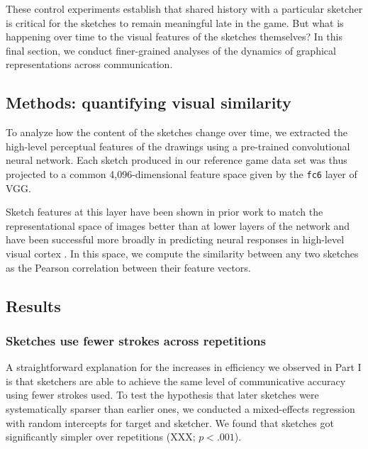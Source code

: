 \documentclass[10pt,letterpaper]{article}
\begin{document}
These control experiments establish that shared history with a particular sketcher is critical for the sketches to remain meaningful late in the game. 
But what is happening over time to the visual features of the sketches themselves? 
In this final section, we conduct finer-grained analyses of the dynamics of graphical representations across communication.



\subsection{Methods: quantifying visual similarity}

To analyze how the content of the sketches change over time, we extracted the high-level perceptual features of the drawings using a pre-trained convolutional neural network. 
Each sketch produced in our reference game data set was thus projected to a common 4,096-dimensional feature space given by the \texttt{fc6} layer of VGG. 

Sketch features at this layer have been shown in prior work to match the representational space of images better than at lower layers of the network \cite{FanCommon2018} and have been successful more broadly in predicting neural responses in high-level visual cortex \cite{yamins2014performance}.
In this space, we compute the similarity between any two sketches as the Pearson correlation between their feature vectors.

\subsection{Results}

\subsubsection{Sketches use fewer strokes across repetitions}

A straightforward explanation for the increases in efficiency we observed in Part I is that sketchers are able to achieve the same level of communicative accuracy using fewer strokes used.
To test the hypothesis that later sketches were systematically sparser than earlier ones, we conducted a mixed-effects regression with random intercepts for target and sketcher.
We found that sketches got significantly simpler over repetitions (XXX; $p < .001$). 
\end{document}
